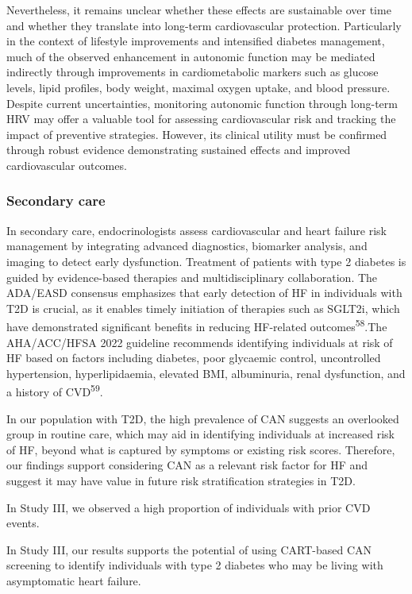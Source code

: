 \documentclass[
  a4paper,
  headsepline=true,
  open=any]{scrbook}
\begin{document}
Nevertheless, it remains unclear whether these effects are sustainable
over time and whether they translate into long-term cardiovascular
protection. Particularly in the context of lifestyle improvements and
intensified diabetes management, much of the observed enhancement in
autonomic function may be mediated indirectly through improvements in
cardiometabolic markers such as glucose levels, lipid profiles, body
weight, maximal oxygen uptake, and blood pressure. Despite current
uncertainties, monitoring autonomic function through long-term HRV may
offer a valuable tool for assessing cardiovascular risk and tracking the
impact of preventive strategies. However, its clinical utility must be
confirmed through robust evidence demonstrating sustained effects and
improved cardiovascular outcomes.

\hypertarget{secondary-care}{%
\subsubsection{Secondary care}\label{secondary-care}}

In secondary care, endocrinologists assess cardiovascular and heart
failure risk management by integrating advanced diagnostics, biomarker
analysis, and imaging to detect early dysfunction. Treatment of patients
with type 2 diabetes is guided by evidence-based therapies and
multidisciplinary collaboration. The ADA/EASD consensus emphasizes that
early detection of HF in individuals with T2D is crucial, as it enables
timely initiation of therapies such as SGLT2i, which have demonstrated
significant benefits in reducing HF-related
outcomes\textsuperscript{58}.The AHA/ACC/HFSA 2022 guideline recommends
identifying individuals at risk of HF based on factors including
diabetes, poor glycaemic control, uncontrolled hypertension,
hyperlipidaemia, elevated BMI, albuminuria, renal dysfunction, and a
history of CVD\textsuperscript{59}.

In our population with T2D, the high prevalence of CAN suggests an
overlooked group in routine care, which may aid in identifying
individuals at increased risk of HF, beyond what is captured by symptoms
or existing risk scores. Therefore, our findings support considering CAN
as a relevant risk factor for HF and suggest it may have value in future
risk stratification strategies in T2D.

In Study III, we observed a high proportion of individuals with prior
CVD events.

In Study III, our results supports the potential of using CART-based CAN
screening to identify individuals with type 2 diabetes who may be living
with asymptomatic heart failure.
\end{document}
